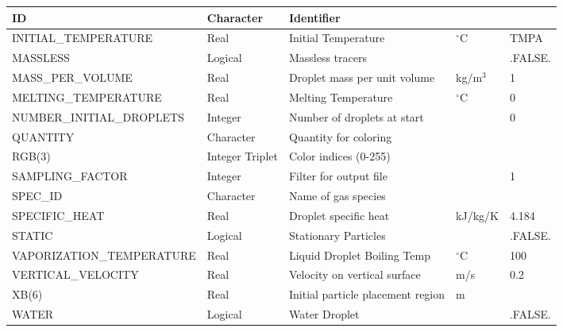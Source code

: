 \documentclass[11pt]{book}
\begin{document}
\begin{table}[H]
\begin{tabular*}{\textwidth}{@{\extracolsep{\fill}}|l|l|l|l|l|}
{\ct ID}                        & Character       & Identifier                        &           &               \\ \hline
{\ct INITIAL\_TEMPERATURE}      & Real            & Initial Temperature               & $^\circ$C & {\ct TMPA}    \\ \hline
{\ct MASSLESS}                  & Logical         & Massless tracers                  &           & {\ct .FALSE.} \\ \hline
{\ct MASS\_PER\_VOLUME}         & Real            & Droplet mass per unit volume      & kg/m$^3$  & 1             \\ \hline
{\ct MELTING\_TEMPERATURE}      & Real            & Melting Temperature               & $^\circ$C & 0             \\ \hline
{\ct NUMBER\_INITIAL\_DROPLETS} & Integer         & Number of droplets at start       &           & 0             \\ \hline
{\ct QUANTITY}                  & Character       & Quantity for coloring             &           &               \\ \hline
{\ct RGB(3)}                    & Integer Triplet & Color indices (0-255)             &           &               \\ \hline
{\ct SAMPLING\_FACTOR}          & Integer         & Filter for output file            &           & 1             \\ \hline
{\ct SPEC\_ID}                  & Character       & Name of gas species               &           &               \\ \hline
{\ct SPECIFIC\_HEAT}            & Real            & Droplet specific heat             & kJ/kg/K   & 4.184         \\ \hline
{\ct STATIC}                    & Logical         & Stationary Particles              &           & {\ct .FALSE.} \\ \hline
{\ct VAPORIZATION\_TEMPERATURE} & Real            & Liquid Droplet Boiling Temp       & $^\circ$C & 100           \\ \hline
{\ct VERTICAL\_VELOCITY}        & Real            & Velocity on vertical surface      & m/s       &  0.2          \\ \hline
{\ct XB(6)}                     & Real            & Initial particle placement region & m         &               \\ \hline
{\ct WATER}                     & Logical         & Water Droplet                     &           & {\ct .FALSE.} \\ \hline
\end{tabular*}
\end{table}
\end{document}
